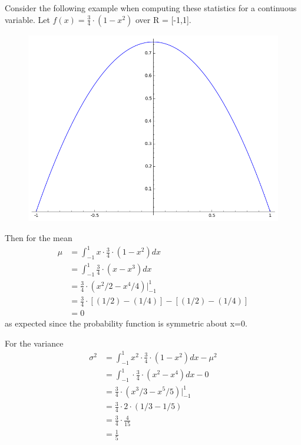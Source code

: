 \documentclass[10pt,]{book}
\numberwithin{equation}{section}
\begin{document}
%
\par
\hypertarget{p-762}{}%
Consider the following example when computing these statistics for a continuous variable. Let \(f(x) = \frac{3}{4} \cdot (1-x^2)\) over R = [-1,1]. \begin{figure}\centering\includegraphics[width=1\linewidth]{images/ContinuousDistributionExample.png}
\end{figure}%
\par
\hypertarget{p-763}{}%
Then for the mean%
\begin{align*}
\mu & = \int_{-1}^1 x \cdot \frac{3}{4} \cdot (1-x^2) dx\\
& = \int_{-1}^1 \frac{3}{4} \cdot (x-x^3) dx\\
& = \frac{3}{4} \cdot (x^2/2-x^4/4) \big |_{-1}^1\\
& = \frac{3}{4} \cdot [(1/2)-(1/4)] - [(1/2) - (1/4)]\\
& = 0
\end{align*}
as expected since the probability function is symmetric about x=0.%
\par
\hypertarget{p-764}{}%
For the variance%
\begin{align*}
\sigma^2 & = \int_{-1}^1 x^2 \cdot \frac{3}{4} \cdot (1-x^2) dx - \mu^2\\
& = \int_{-1}^1 \cdot \frac{3}{4} \cdot (x^2-x^4) dx - 0\\
& = \frac{3}{4} \cdot (x^3 /3 -x^5 / 5) \big |_{-1}^1\\
& = \frac{3}{4} \cdot 2 \cdot (1/3-1/5)\\
& = \frac{3}{4} \cdot \frac{4}{15}\\
& = \frac{1}{5}
\end{align*}
\end{document}
